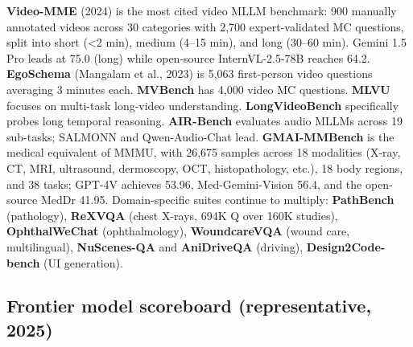 \documentclass{article}
\begin{document}
\textbf{Video-MME} (2024) is the most cited video MLLM benchmark: 900 manually annotated videos across 30 categories with 2,700 expert-validated MC questions, split into short (\textless2 min), medium (4--15 min), and long (30--60 min). Gemini 1.5 Pro leads at 75.0 (long) while open-source InternVL-2.5-78B reaches 64.2. \textbf{EgoSchema} (Mangalam et al., 2023) is 5,063 first-person video questions averaging 3 minutes each. \textbf{MVBench} has 4,000 video MC questions. \textbf{MLVU} focuses on multi-task long-video understanding. \textbf{LongVideoBench} specifically probes long temporal reasoning. \textbf{AIR-Bench} evaluates audio MLLMs across 19 sub-tasks; SALMONN and Qwen-Audio-Chat lead. \textbf{GMAI-MMBench} \citep{chen20242024} is the medical equivalent of MMMU, with 26,675 samples across 18 modalities (X-ray, CT, MRI, ultrasound, dermoscopy, OCT, histopathology, etc.), 18 body regions, and 38 tasks; GPT-4V achieves 53.96, Med-Gemini-Vision 56.4, and the open-source MedDr 41.95. Domain-specific suites continue to multiply: \textbf{PathBench} (pathology), \textbf{ReXVQA} (chest X-rays, 694K Q over 160K studies), \textbf{OphthalWeChat} (ophthalmology), \textbf{WoundcareVQA} (wound care, multilingual), \textbf{NuScenes-QA} and \textbf{AniDriveQA} (driving), \textbf{Design2Code-bench} (UI generation).

\subsection{Frontier model scoreboard (representative, 2025)}\label{frontier-model-scoreboard-representative-2025}
\end{document}
